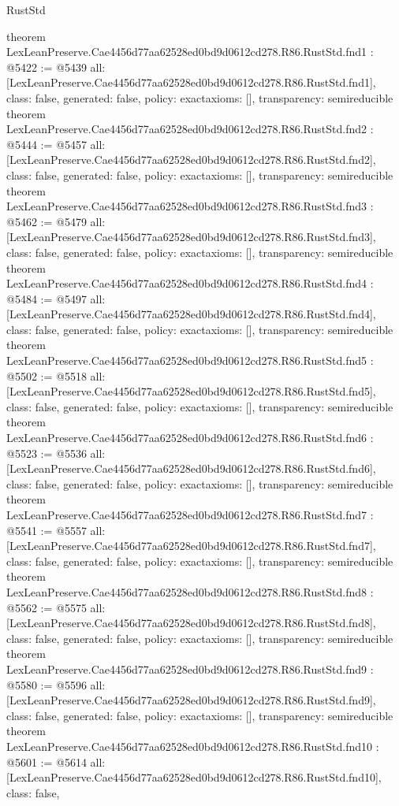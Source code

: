 \begin{lexlean}{RustStd}
\begin{coremodule}
{}
theorem LexLeanPreserve.Cae4456d77aa62528ed0bd9d0612cd278.R86.RustStd.fnd1 : @5422 := @5439 {
  all: [LexLeanPreserve.Cae4456d77aa62528ed0bd9d0612cd278.R86.RustStd.fnd1],
  class: false,
  generated: false,
  policy: exact{axioms: []},
  transparency: semireducible
}
theorem LexLeanPreserve.Cae4456d77aa62528ed0bd9d0612cd278.R86.RustStd.fnd2 : @5444 := @5457 {
  all: [LexLeanPreserve.Cae4456d77aa62528ed0bd9d0612cd278.R86.RustStd.fnd2],
  class: false,
  generated: false,
  policy: exact{axioms: []},
  transparency: semireducible
}
theorem LexLeanPreserve.Cae4456d77aa62528ed0bd9d0612cd278.R86.RustStd.fnd3 : @5462 := @5479 {
  all: [LexLeanPreserve.Cae4456d77aa62528ed0bd9d0612cd278.R86.RustStd.fnd3],
  class: false,
  generated: false,
  policy: exact{axioms: []},
  transparency: semireducible
}
theorem LexLeanPreserve.Cae4456d77aa62528ed0bd9d0612cd278.R86.RustStd.fnd4 : @5484 := @5497 {
  all: [LexLeanPreserve.Cae4456d77aa62528ed0bd9d0612cd278.R86.RustStd.fnd4],
  class: false,
  generated: false,
  policy: exact{axioms: []},
  transparency: semireducible
}
theorem LexLeanPreserve.Cae4456d77aa62528ed0bd9d0612cd278.R86.RustStd.fnd5 : @5502 := @5518 {
  all: [LexLeanPreserve.Cae4456d77aa62528ed0bd9d0612cd278.R86.RustStd.fnd5],
  class: false,
  generated: false,
  policy: exact{axioms: []},
  transparency: semireducible
}
theorem LexLeanPreserve.Cae4456d77aa62528ed0bd9d0612cd278.R86.RustStd.fnd6 : @5523 := @5536 {
  all: [LexLeanPreserve.Cae4456d77aa62528ed0bd9d0612cd278.R86.RustStd.fnd6],
  class: false,
  generated: false,
  policy: exact{axioms: []},
  transparency: semireducible
}
theorem LexLeanPreserve.Cae4456d77aa62528ed0bd9d0612cd278.R86.RustStd.fnd7 : @5541 := @5557 {
  all: [LexLeanPreserve.Cae4456d77aa62528ed0bd9d0612cd278.R86.RustStd.fnd7],
  class: false,
  generated: false,
  policy: exact{axioms: []},
  transparency: semireducible
}
theorem LexLeanPreserve.Cae4456d77aa62528ed0bd9d0612cd278.R86.RustStd.fnd8 : @5562 := @5575 {
  all: [LexLeanPreserve.Cae4456d77aa62528ed0bd9d0612cd278.R86.RustStd.fnd8],
  class: false,
  generated: false,
  policy: exact{axioms: []},
  transparency: semireducible
}
theorem LexLeanPreserve.Cae4456d77aa62528ed0bd9d0612cd278.R86.RustStd.fnd9 : @5580 := @5596 {
  all: [LexLeanPreserve.Cae4456d77aa62528ed0bd9d0612cd278.R86.RustStd.fnd9],
  class: false,
  generated: false,
  policy: exact{axioms: []},
  transparency: semireducible
}
theorem LexLeanPreserve.Cae4456d77aa62528ed0bd9d0612cd278.R86.RustStd.fnd10 : @5601 := @5614 {
  all: [LexLeanPreserve.Cae4456d77aa62528ed0bd9d0612cd278.R86.RustStd.fnd10],
  class: false,
}
\end{coremodule}
\end{lexlean}
